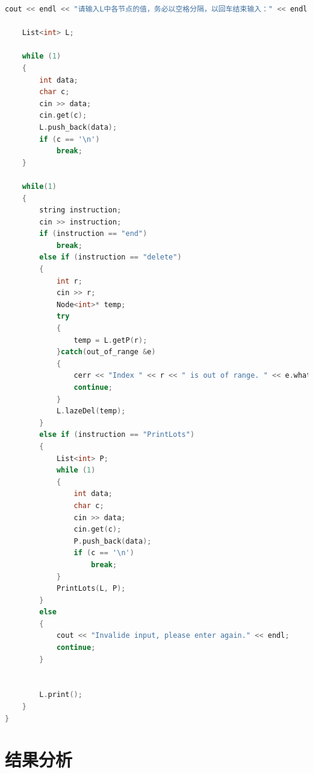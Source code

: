 \documentclass[UTF8]{ctexart}
\begin{document}
\begin{lstlisting}[language=C++,caption={list\_ADT代码},label={vec_code}]
    cout << endl << "请输入L中各节点的值，务必以空格分隔，以回车结束输入：" << endl;

    List<int> L;

    while (1)
    {
        int data;
        char c;
        cin >> data;
        cin.get(c);
        L.push_back(data);
        if (c == '\n')
            break;
    }
  
    while(1)
    {
        string instruction;
        cin >> instruction;
        if (instruction == "end")
            break;
        else if (instruction == "delete")
        {
            int r;
            cin >> r;
            Node<int>* temp;
            try
            {
                temp = L.getP(r);
            }catch(out_of_range &e)
            {
                cerr << "Index " << r << " is out of range. " << e.what() << endl;
                continue;
            }
            L.lazeDel(temp);
        }
        else if (instruction == "PrintLots")
        {
            List<int> P;
            while (1)
            {
                int data;
                char c;
                cin >> data;
                cin.get(c);
                P.push_back(data);
                if (c == '\n')
                    break;
            }
            PrintLots(L, P);
        }
        else
        {
            cout << "Invalide input, please enter again." << endl;
            continue;
        }
        

        L.print();
    }
}
	\end{lstlisting}
	
	\section{结果分析}
	
\end{document}
